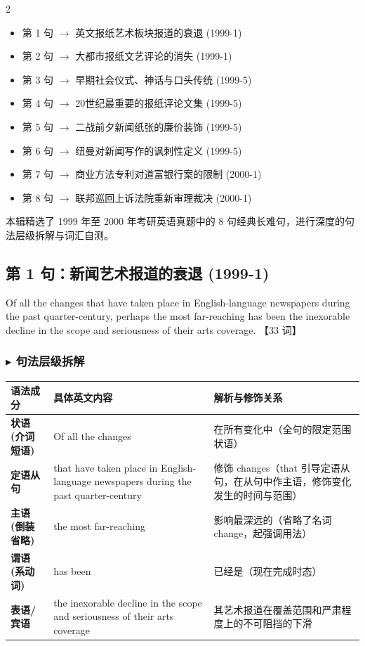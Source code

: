 \documentclass[cn,normal,11pt]{elegantnote}
\newcommand{\introductionname}{内容概要}
\newenvironment{introduction}[1][\introductionname]{
  \begin{tcolorbox}[introductionsty,title={#1}]
    \begin{multicols}{2}
      \begin{itemize}[label=\textcolor{structurecolor}{\SquareShadowBottomRight}]}{
      \end{itemize}
    \end{multicols}
  \end{tcolorbox}}
\begin{document}
\begin{introduction}
  \item 第 1 句 $\rightarrow$ 英文报纸艺术板块报道的衰退 (1999-1)
  \item 第 2 句 $\rightarrow$ 大都市报纸文艺评论的消失 (1999-1)
  \item 第 3 句 $\rightarrow$ 早期社会仪式、神话与口头传统 (1999-5)
  \item 第 4 句 $\rightarrow$ 20世纪最重要的报纸评论文集 (1999-5)
  \item 第 5 句 $\rightarrow$ 二战前夕新闻纸张的廉价装饰 (1999-5)
  \item 第 6 句 $\rightarrow$ 纽曼对新闻写作的讽刺性定义 (1999-5)
  \item 第 7 句 $\rightarrow$ 商业方法专利对道富银行案的限制 (2000-1)
  \item 第 8 句 $\rightarrow$ 联邦巡回上诉法院重新审理裁决 (2000-1)
\end{introduction}

本辑精选了 1999 年至 2000 年考研英语真题中的 8 句经典长难句，进行深度的句法层级拆解与词汇自测。

\subsection{第 1 句：新闻艺术报道的衰退 (1999-1)}

\begin{note}
  Of all the changes that have taken place in English-language newspapers during the past quarter-century, perhaps the most far-reaching has been the inexorable decline in the scope and seriousness of their arts coverage. 【33 词】
\end{note}

\subsubsection*{$\blacktriangleright$ 句法层级拆解}
\noindent
\begin{tabularx}{\textwidth}{p{3.2cm} X X}
  \toprule
  \textbf{语法成分} & \textbf{具体英文内容} & \textbf{解析与修饰关系} \\
  \midrule
  \textbf{状语 (介词短语)} & Of all the changes & 在所有变化中（全句的限定范围状语） \\
  \midrule
  \textbf{定语从句} & that have taken place in English-language newspapers during the past quarter-century & 修饰 changes（that 引导定语从句，在从句中作主语，修饰变化发生的时间与范围） \\
  \midrule
  \textbf{主语 (倒装省略)} & the most far-reaching & 影响最深远的（省略了名词 change，起强调用法） \\
  \midrule
  \textbf{谓语 (系动词)} & has been & 已经是（现在完成时态） \\
  \midrule
  \textbf{表语/宾语} & the inexorable decline in the scope and seriousness of their arts coverage & 其艺术报道在覆盖范围和严肃程度上的不可阻挡的下滑 \\
  \bottomrule
\end{tabularx}
\end{document}
